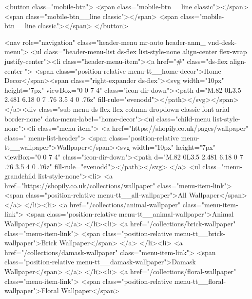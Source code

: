 {{{{{    <button class="mobile-btn">
      <span class="mobile-btn__line classic"></span>
      <span class="mobile-btn__line classic"></span>
      <span class="mobile-btn__line classic"></span>
    </button>

    
<nav role="navigation" class="header-menu mr-auto header-anm_ vnd-desk-menu">
  <ul class="header-menu-list ds-flex list-style-none align-center flex-wrap justify-center"><li class="header-menu-item"><a href="#" class="ds-flex align-center ">
          <span class="position-relative menu-tt__home-decor">Home Decor</span><span class="right-expander ds-flex"><svg width="10px" height="7px" viewBox="0 0 7 4" class="icon-dir-down"><path d="M.82 0L3.5 2.481 6.18 0 7 .76 3.5 4 0 .76z" fill-rule="evenodd"></path></svg></span></a><div class="sub-menu ds-flex flex-column dropdown-classic font-arial border-none" data-menu-label="home-decor"><ul class="child-menu list-style-none"><li class="menu-item">
                    <a href="https://shopily.co.uk/pages/wallpaper" class=" menu-list-header">
                      <span class="position-relative menu-tt__wallpaper">Wallpaper</span><svg width="10px" height="7px" viewBox="0 0 7 4" class="icon-dir-down"><path d="M.82 0L3.5 2.481 6.18 0 7 .76 3.5 4 0 .76z" fill-rule="evenodd"></path></svg>
</a>
                    <ul class="menu-grandchild list-style-none"><li>
                          <a href="https://shopily.co.uk/collections/wallpaper" class="menu-item-link">
                            <span class="position-relative menu-tt__all-wallpaper">All Wallpaper</span>
                          </a>
                        </li><li>
                          <a href="/collections/animal-wallpaper" class="menu-item-link">
                            <span class="position-relative menu-tt__animal-wallpaper">Animal Wallpaper</span>
                          </a>
                        </li><li>
                          <a href="/collections/brick-wallpaper" class="menu-item-link">
                            <span class="position-relative menu-tt__brick-wallpaper">Brick Wallpaper</span>
                          </a>
                        </li><li>
                          <a href="/collections/damask-wallpaper" class="menu-item-link">
                            <span class="position-relative menu-tt__damask-wallpaper">Damask Wallpaper</span>
                          </a>
                        </li><li>
                          <a href="/collections/floral-wallpaper" class="menu-item-link">
                            <span class="position-relative menu-tt__floral-wallpaper">Floral Wallpaper</span>
}}}}}
